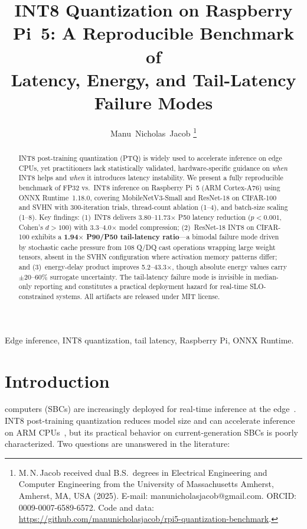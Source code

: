\documentclass[journal]{IEEEtran}
\title{INT8 Quantization on Raspberry Pi~5: A Reproducible Benchmark of\\
Latency, Energy, and Tail-Latency Failure Modes}
\author{Manu~Nicholas~Jacob%
\thanks{M.\,N.\,Jacob received dual B.S.\ degrees in Electrical Engineering and Computer Engineering from the University of Massachusetts Amherst, Amherst, MA, USA (2025).
E-mail: manunicholasjacob@gmail.com.
ORCID: 0009-0007-6589-6572.
Code and data: \protect\url{https://github.com/manunicholasjacob/rpi5-quantization-benchmark}.}}
\begin{document}
\maketitle

\begin{abstract}
INT8 post-training quantization (PTQ) is widely used to accelerate inference on edge CPUs, yet practitioners lack statistically validated, hardware-specific guidance on \emph{when} INT8 helps and \emph{when} it introduces latency instability. We present a fully reproducible benchmark of FP32 vs.\ INT8 inference on Raspberry Pi~5 (ARM Cortex-A76) using ONNX Runtime~1.18.0, covering MobileNetV3-Small and ResNet-18 on CIFAR-100 and SVHN with 300-iteration trials, thread-count ablation (1--4), and batch-size scaling (1--8). Key findings: (1)~INT8 delivers 3.80--11.73$\times$ P50 latency reduction ($p < 0.001$, Cohen's $d > 100$) with 3.3--4.0$\times$ model compression; (2)~ResNet-18 INT8 on CIFAR-100 exhibits a \textbf{1.94$\times$ P90/P50 tail-latency ratio}—a bimodal failure mode driven by stochastic cache pressure from 108 Q/DQ cast operations wrapping large weight tensors, absent in the SVHN configuration where activation memory patterns differ; and (3)~energy-delay product improves 5.2--43.3$\times$, though absolute energy values carry $\pm$20--60\% surrogate uncertainty. The tail-latency failure mode is invisible in median-only reporting and constitutes a practical deployment hazard for real-time SLO-constrained systems. All artifacts are released under MIT license.
\end{abstract}

\begin{IEEEkeywords}
Edge inference, INT8 quantization, tail latency, Raspberry Pi, ONNX Runtime.
\end{IEEEkeywords}

\section{Introduction}

 computers (SBCs) are increasingly deployed for real-time inference at the edge~\cite{banbury2021mlperf}. INT8 post-training quantization reduces model size and can accelerate inference on ARM CPUs~\cite{jacob2018quantization}, but its practical behavior on current-generation SBCs is poorly characterized. Two questions are unanswered in the literature:
\end{document}
